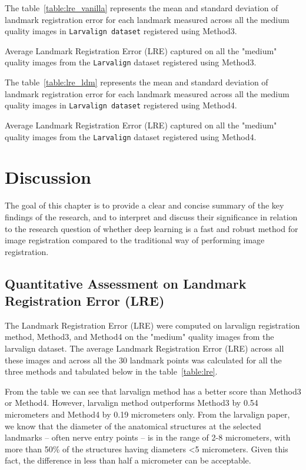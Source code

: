 \documentclass{report}
\begin{document}
	The table~\ref{table:lre_vanilla} represents the mean and standard deviation of landmark registration error for each landmark measured across all the medium quality images in \texttt{Larvalign dataset} registered using Method3.
	
	\begin{table}[h]
		\centering
		
		\caption{Average Landmark Registration Error (LRE) captured on all the "medium" quality images from the \texttt{Larvalign} dataset registered using Method3.}
		\label{table:lre_vanilla}
	\end{table}

	The table~\ref{table:lre_ldm} represents the mean and standard deviation of landmark registration error for each landmark measured across all the medium quality images in \texttt{Larvalign dataset} registered using Method4.
	
	\begin{table}[h]
		\centering
		
		\caption{Average Landmark Registration Error (LRE) captured on all the "medium" quality images from the \texttt{Larvalign} dataset registered using Method4.}
		\label{table:lre_ldm}
	\end{table}
	
	\chapter{Discussion}
	The goal of this chapter is to provide a clear and concise summary of the key findings of the research, and to interpret and discuss their significance in relation to the research question of whether deep learning is a fast and robust method for image registration compared to the traditional way of performing image registration.
	
	\section{Quantitative Assessment on Landmark Registration Error (LRE)}
	The Landmark Registration Error (LRE) were computed on larvalign registration method, Method3, and Method4 on the "medium" quality images from the larvalign dataset. The average Landmark Registration Error (LRE) across all these images and across all the 30 landmark points was calculated for all the three methods and tabulated below in the table~\ref{table:lre}.
	
	From the table we can see that larvalign method has a better score than Method3 or Method4. However, larvalign method outperforms Method3 by 0.54 micrometers and Method4 by 0.19 micrometers only. From the larvalign paper, we know that the diameter of the anatomical structures at the selected landmarks – often nerve entry points – is in the range of 2-8 micrometers, with more than 50\% of the structures having diameters \textless 5 micrometers. Given this fact, the difference in less than half a micrometer can be acceptable.
	
\end{document}
